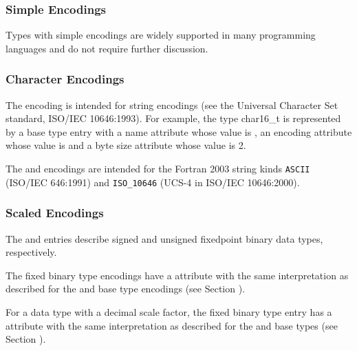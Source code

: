 \subsubsection{Simple Encodings}
\label{simpleencodings}
Types with simple encodings are widely supported in many
programming languages and do not require further discussion.

\subsubsection{Character Encodings}
\label{characterencodings}
The \DWATEUTF{} encoding is intended for 
string encodings (see the Universal Character Set standard,
ISO/IEC 10646:1993).
For example, the 
 type char16\_t is
represented by a base type entry with a name attribute whose
value is , an encoding attribute whose value
is \DWATEUTF{} and a byte size attribute whose value is 2.

The \DWATEASCII{} and \DWATEUCS{} encodings are intended for
the {Fortran 2003} string kinds 
\texttt{ASCII} (ISO/IEC 646:1991) and
\texttt{ISO\_10646} (UCS-4 in ISO/IEC 10646:2000).

\subsubsection{Scaled Encodings}
\label{scaledencodings}
The \DWATEsignedfixed{} and \DWATEunsignedfixed{} entries
describe signed and unsigned fixed\dash point binary data types,
respectively.

The fixed binary type encodings have a
\DWATdigitcount{} attribute
with the same interpretation as described for the
\DWATEpackeddecimal{} and \DWATEnumericstring{} base type encodings
(see Section ).

For a data type with a decimal scale factor, the fixed binary
type entry has a \DWATdecimalscale{} attribute 
with the same interpretation as described for the 
\DWATEpackeddecimal{} and \DWATEnumericstring{} base types
(see Section ).

